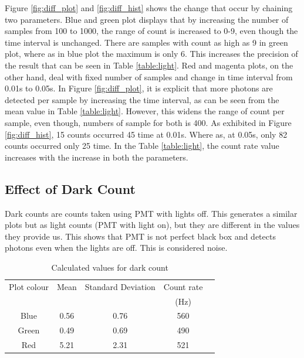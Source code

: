 \documentclass[a4paper,12pt]{article}
\begin{document}
Figure \ref{fig:diff_plot} and \ref{fig:diff_hist} shows the change that occur by chaining two parameters. Blue and green plot displays that by increasing the number of samples from 100 to 1000, the range of count is increased to 0-9, even though the time interval is unchanged. There are samples with count as high as 9 in green plot, where as in blue plot the maximum is only 6. This increases the precision of the result that can be seen in Table \ref{table:light}. Red and magenta plots, on the other hand, deal with fixed number of samples and change in time interval from 0.01s to 0.05s. In Figure \ref{fig:diff_plot}, it is explicit that more photons are detected per sample by increasing the time interval, as can be seen from the mean value in Table \ref{table:light}. However, this widens the range of count per sample, even though, numbers of sample for both is 400. As exhibited in Figure \ref{fig:diff_hist}, 15 counts occurred 45 time at 0.01s. Where as, at 0.05s, only 82 counts occurred only 25 time. In the Table \ref{table:light}, the count rate value increases with the increase in both the parameters.

\subsection{Effect of Dark Count}
\label{sec:dark}
Dark counts are counts taken using PMT with lights off. This generates a similar plots but as light counts (PMT with light on), but they are different in the values they provide us. This shows that PMT is not perfect black box and detects photons even when the lights are off. This is considered noise. %
\begin{table}[H]
\centering %
\caption{Calculated values for dark count}
\footnotesize

\begin{tabular}{ccccc}%
\hline
\hline

Plot colour  & Mean & Standard Deviation & Count rate \\
& & &(Hz)\\ 
\hline
\hline
Blue&  0.56 &   0.76 & 560\\
Green&  0.49&  0.69&  490\\
 Red & 5.21   &   2.31& 521\\
\hline
\hline


\end{tabular}
\label{table:dark} %
\end{table}
\end{document}

